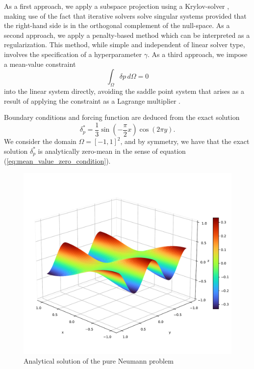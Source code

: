 As a first approach, we apply a subspace projection using a Krylov-solver \cite{vorst_iterative_2003}, making use of the fact that iterative solvers solve singular systems provided that the right-hand side is in the orthogonal complement of the null-space.
As a second approach, we apply a penalty-based method which can be interpreted as a regularization.
This method, while simple and independent of linear solver type, involves the specification of a hyperparameter $\gamma$.
As a third approach, we impose a mean-value constraint 
\begin{equation}
  \int_{\Omega}^{} \delta p \,d\Omega = 0
  \label{eq:mean_value_zero_condition}
\end{equation}
into the linear system directly, avoiding the saddle point system that arises as a result of applying the constraint as a Lagrange multiplier \cite{bochev_finite_2005}.


Boundary conditions and forcing function are deduced from the exact solution
\begin{equation}
    \delta_p^* = \frac{1}{3} \sin\left(-\frac{\pi}{2} x \right) \cos\left(2\pi y\right).
\end{equation}
We consider the domain $\Omega = [-1, 1]^2$, and by symmetry, we have that the exact solution $\delta_p^*$ is analytically zero-mean in the sense of equation (\ref{eq:mean_value_zero_condition}).

\begin{figure}[htpb]
  \centering
  \includegraphics[width=0.5\linewidth]{img/dp_study_analytical.pdf}
  \caption{Analytical solution of the pure Neumann problem}
  \label{fig:dp_neumann_problem_analytical}
\end{figure}


